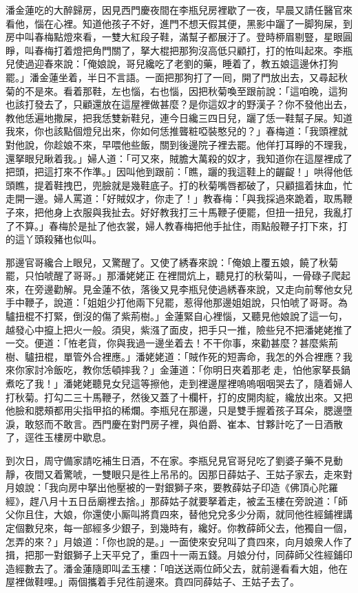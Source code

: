 潘金蓮吃的大醉歸房，因見西門慶夜間在李瓶兒房裡歇了一夜，早晨又請任醫官來看他，惱在心裡。知道他孩子不好，進門不想天假其便，黑影中躧了一脚狗屎，到房中叫春梅點燈來看，一雙大紅段子鞋，滿幫子都展汙了。登時桺眉剔豎，星眼圓睜，叫春梅打着燈把角門關了，拏大棍把那狗沒高低只顧打，打的恠叫起來。李瓶兒使過迎春來說：「俺娘說，哥兒纔吃了老劉的藥，睡着了，教五娘這邊休打狗罷。」潘金蓮坐着，半日不言語。一面把那狗打了一囘，開了門放出去，又尋起秋菊的不是來。看着那鞋，左也惱，右也惱，因把秋菊喚至跟前說：「這咱晚，這狗也該打發去了，只顧還放在這屋裡做甚麼？是你這奴才的野漢子？你不發他出去，教他恁遍地撒屎，{}把我恁雙新鞋兒，連今日纔三四日兒，躧了恁一鞋幫子屎。知道我來，你也該點個燈兒出來，你如何恁推聾粧啞裝憨兒的？」春梅道：「我頭裡就對他說，你趁娘不來，早喂他些飯，關到後邊院子裡去罷。他佯打耳睜的不理我，還拏眼兒瞅着我。」婦人道：「可又來，賊膽大萬殺的奴才，我知道你在這屋裡成了把頭，把這打來不作準。」因叫他到跟前：「瞧，躧的我這鞋上的齷齪！」哄得他低頭瞧，提着鞋拽巴，兜臉就是幾鞋底子。打的秋菊嘴唇都破了，只顧搵着抹血，忙走開一邊。婦人罵道：「好賊奴才，你走了！」教春梅：「與我採過來跪着，取馬鞭子來，把他身上衣服與我扯去。好好教我打三十馬鞭子便罷，但扭一扭兒，我亂打了不算。」春梅於是扯了他衣裳，婦人教春梅把他手扯住，雨點般鞭子打下來，打的這丫頭殺豬也似叫。

那邊官哥纔合上眼兒，又驚醒了。{}又使了綉春來說：「俺娘上覆五娘，饒了秋菊罷，只怕唬醒了哥哥。」那潘姥姥正𢱉在裡間炕上，聽見打的秋菊叫，一骨碌子爬起來，在旁邊勸解。見金蓮不依，落後又見李瓶兒使過綉春來說，又走向前奪他女兒手中鞭子，說道：「姐姐少打他兩下兒罷，惹得他那邊姐姐說，只怕唬了哥哥。為驢扭棍不打緊，倒沒的傷了紫荊樹。」金蓮緊自心裡惱，又聽見他娘說了這一句，越發心中攛上把火一般。須臾，紫漒了面皮，把手只一推，險些兒不把潘姥姥推了一交。便道：「恠老貨，你與我過一邊坐着去！不干你事，來勸甚麼？甚麼紫荊樹、驢扭棍，單管外合裡應。」潘姥姥道：「賊作死的短壽命，{}我怎的外合裡應？我來你家討冷飯吃，教你恁頓摔我？」金蓮道：「你明日夾着那老𣭈走，怕他家拏長鍋煮吃了我！」{}潘姥姥聽見女兒這等擦他，走到裡邊屋裡嗚嗚咽咽哭去了，隨着婦人打秋菊。打勾二三十馬鞭子，然後又蓋了十欄杆，打的皮開肉綻，纔放出來。又把他臉和腮頰都用尖指甲掐的稀爛。{}李瓶兒在那邊，只是雙手握着孩子耳朵，腮邊墮淚，敢怒而不敢言。西門慶在對門房子裡，與伯爵、崔本、甘夥計吃了一日酒散了，逕徃玉樓房中歇息。

到次日，周守備家請吃補生日酒，不在家。李瓶兒見官哥兒吃了劉婆子藥不見動靜，夜間又着驚唬，一雙眼只是徃上吊吊的。因那日薛姑子、王姑子家去，走來對月娘說：「我向房中拏出他壓被的一對銀獅子來，要教薛姑子印造《佛頂心陀羅經》，趕八月十五日岳廟裡去捨。」那薛姑子就要拏着走，被孟玉樓在旁說道：「師父你且住，大娘，你還使小厮叫將賁四來，替他兌兌多少分兩，就同他徃經鋪裡講定個數兒來，每一部經多少銀子，到幾時有，纔好。你教薛師父去，他獨自一個，怎弄的來？」{}月娘道：「你也說的是。」一面使來安兒叫了賁四來，向月娘衆人作了揖，把那一對銀獅子上天平兌了，重四十一兩五錢。月娘分付，同薛師父徃經鋪印造經數去了。潘金蓮隨即叫孟玉樓：「咱送送兩位師父去，就前邊看看大姐，他在屋裡做鞋哩。」兩個攜着手兒徃前邊來。賁四同薛姑子、王姑子去了。

